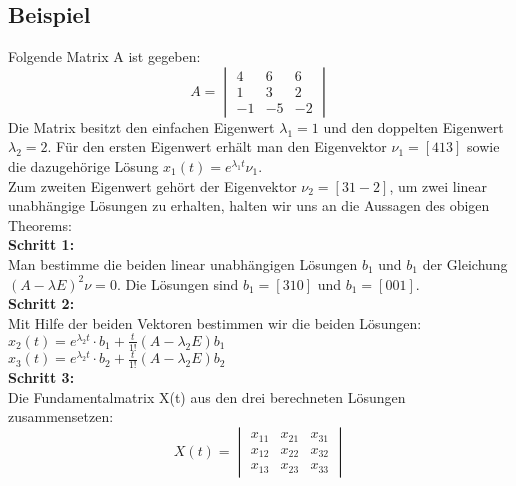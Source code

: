 \subsection{Beispiel}
Folgende Matrix A ist gegeben: 
\begin{equation*}
	A =     
	\begin{vmatrix} 
	        4 & 6 & 6 \\ 
	        1 & 3 & 2 \\
	        -1 & -5 & -2    
	\end{vmatrix}
\end{equation*}
Die Matrix besitzt den einfachen Eigenwert $\lambda_1 = 1$ und den doppelten Eigenwert $\lambda_2=2$. Für den ersten Eigenwert erhält man den Eigenvektor $\nu_1 = [4 1 3]$ sowie die dazugehörige Lösung $x_1(t) = e^{\lambda_1 t}\nu_1$.\\
Zum zweiten Eigenwert gehört der Eigenvektor $\nu_2 = [3 1 -2]$, um zwei linear unabhängige Lösungen zu erhalten, halten wir uns an die Aussagen des obigen Theorems:\\ 
\textbf{Schritt 1:} \\
Man bestimme die beiden linear unabhängigen Lösungen $b_1$ und $b_1$ der Gleichung $(A-\lambda E)^2 \nu =0$.
Die Lösungen sind $b_1 =  [3 1 0]$ und $b_1 =  [0 0 1]$. \\
\textbf{Schritt 2:} \\
Mit Hilfe der beiden Vektoren bestimmen wir die beiden Lösungen: \\
$x_2(t) = e^{\lambda_2 t} \cdot {b_1 + \frac{t}{1!}(A-\lambda_2 E)b_1}$\\
$x_3(t) = e^{\lambda_2 t} \cdot {b_2 + \frac{t}{1!}(A-\lambda_2 E)b_2}$\\
\textbf{Schritt 3:} \\
Die Fundamentalmatrix X(t) aus den drei berechneten Lösungen zusammensetzen:\\
\begin{equation*}
	X(t) =     
	\begin{vmatrix} 
	        x_{11} & x_{21} & x_{31}\\ 
	        x_{12} & x_{22} & x_{32}\\
	        x_{13} & x_{23} & x_{33}    
	\end{vmatrix}
\end{equation*}

